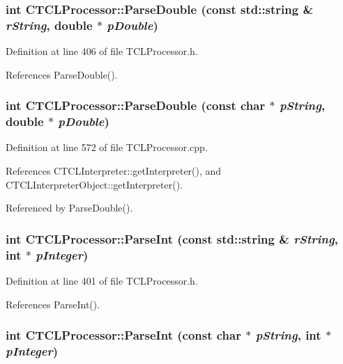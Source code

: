 \subsubsection{\setlength{\rightskip}{0pt plus 5cm}int CTCLProcessor::Parse\-Double (const std::string \& {\em r\-String}, double $\ast$ {\em p\-Double})\hspace{0.3cm}{\tt  [inline]}}\label{classCTCLProcessor_a12}




Definition at line 406 of file TCLProcessor.h.

References Parse\-Double().
\subsubsection{\setlength{\rightskip}{0pt plus 5cm}int CTCLProcessor::Parse\-Double (const char $\ast$ {\em p\-String}, double $\ast$ {\em p\-Double})}\label{classCTCLProcessor_a11}




Definition at line 572 of file TCLProcessor.cpp.

References CTCLInterpreter::get\-Interpreter(), and CTCLInterpreter\-Object::get\-Interpreter().

Referenced by Parse\-Double().
\subsubsection{\setlength{\rightskip}{0pt plus 5cm}int CTCLProcessor::Parse\-Int (const std::string \& {\em r\-String}, int $\ast$ {\em p\-Integer})\hspace{0.3cm}{\tt  [inline]}}\label{classCTCLProcessor_a10}




Definition at line 401 of file TCLProcessor.h.

References Parse\-Int().
\subsubsection{\setlength{\rightskip}{0pt plus 5cm}int CTCLProcessor::Parse\-Int (const char $\ast$ {\em p\-String}, int $\ast$ {\em p\-Integer})}\label{classCTCLProcessor_a9}




